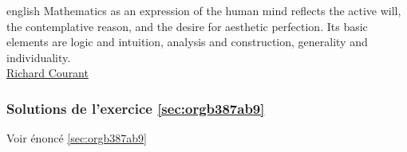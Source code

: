 \documentclass[a4paper, 11pt, twoside]{article}
\begin{document}
\begin{foreigndisplayquote}{english}
Mathematics as an expression of the human mind reflects the active
will, the contemplative reason, and the desire for aesthetic
perfection. Its basic elements are logic and intuition, analysis
and construction, generality and individuality.\\

\href{https://en.wikipedia.org/wiki/Richard\_Courant}{Richard Courant}
\end{foreigndisplayquote}

\startcontents[level-2]


\subsubsection{Solutions de l'exercice \ref{sec:orgb387ab9}}
\label{sec:org43d6bc9}
Voir énoncé \ref{sec:orgb387ab9}
\end{document}
